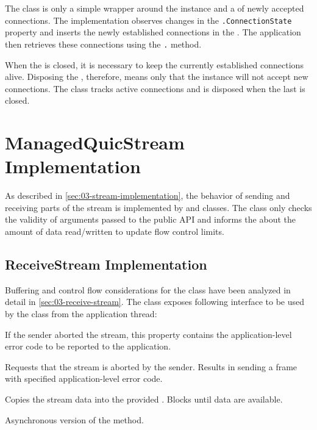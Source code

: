 The \ManagedQuicListener{} class is only a simple wrapper around the \QuicServerSocketContext{}
instance and a \ChannelOf{\ManagedQuicConnection{}} of newly accepted connections. The
\QuicServerSocketContext{} implementation observes changes in the
\texttt{\ManagedQuicConnection{}.ConnectionState} property and inserts the newly established
connections in the . The application then retrieves these connections using the
\texttt{\ManagedQuicListener{}.} method.

When the \ManagedQuicListener{} is closed, it is necessary to keep the currently established
connections alive. Disposing the \ManagedQuicListener{}, therefore, means only that the
\QuicServerSocketContext{} instance will not accept new connections. The \QuicServerSocketContext{}
class tracks active connections and is disposed when the last \ManagedQuicConnection{} is closed.

\section{ManagedQuicStream Implementation}

As described in \autoref{sec:03-stream-implementation}, the behavior of sending and receiving parts
of the stream is implemented by \ReceiveStream{} and \SendStream{} classes. The \ManagedQuicStream{}
class only checks the validity of arguments passed to the public API and informs the
\ManagedQuicConnection{} about the amount of data read/written to update flow control limits.

\subsection{ReceiveStream Implementation}

Buffering and control flow considerations for the \ReceiveStream{} class have been analyzed in
detail in \autoref{sec:03-receive-stream}. The \ReceiveStream{} class exposes following interface to
be used by the \ManagedQuicStream{} class from the application thread:

\begin{description}

   If the sender aborted the stream, this property
contains the application-level error code to be reported to the application.

   Requests that the stream is aborted
by the sender. Results in sending a \STOPSENDING{} frame with specified application-level error
code.

   Copies the stream data into the
provided \SpanOf{\Byte{}}. Blocks until data are available.

   Asynchronous version of the  method.

\end{description}

